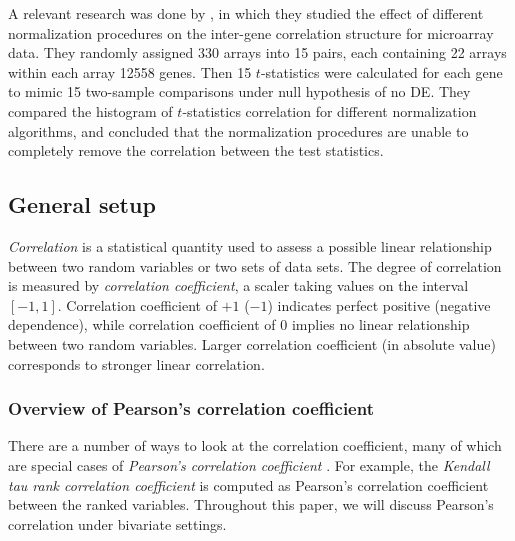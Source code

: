 	
	A relevant research was done by \citet{qiu2005effects}, in which they studied the effect of 
	different
	normalization procedures on the inter-gene correlation structure for microarray data. They 
	randomly
	assigned 330 arrays into 15 pairs, each containing 22 arrays within each array 12558 genes. 
	Then 15
	$t$-statistics were calculated for each gene to mimic 15 two-sample comparisons under null
	hypothesis of no DE. They compared the histogram of $t$-statistics correlation for different
	normalization algorithms, and concluded that the normalization procedures are unable to 
	completely
	remove the correlation between the test statistics. %
	
	
	
	
	
	
	
	\subsection{General setup}
		\textit{Correlation} is a statistical quantity used to assess a possible linear 
		relationship 
		between two random variables or two sets of 
		data sets. The degree of correlation is measured by \textit{correlation coefficient}, a 
		scaler 
		taking values on the interval $[-1, 1]$. 
		Correlation coefficient of $+1$ ($-1$) indicates perfect positive (negative dependence), 
		while 
		correlation coefficient of 0 implies no linear 
		relationship between two random variables. Larger correlation coefficient (in absolute 
		value) 
		corresponds to stronger linear correlation. 
		
	\subsubsection{Overview of Pearson's correlation coefficient}\label{subsec:generalsetup}

	There are a number of ways to look at the correlation coefficient, many of which are special 
	cases of \textit{Pearson's correlation coefficient} 
	\citep{lee1988thirteen}. For example, the \textit{Kendall tau rank correlation coefficient} is 
	computed as Pearson's correlation coefficient between the ranked variables. Throughout this 
	paper, we will discuss Pearson's correlation under bivariate settings. 
	

